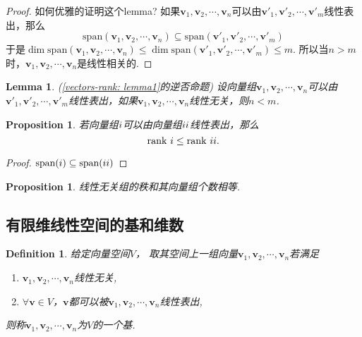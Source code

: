 \documentclass{article}
\newtheorem{lemma}[theorem]{Lemma}
\newtheorem{proposition}[theorem]{Proposition}
\newtheorem{definition}[theorem]{Definition}
\newcommand{\mbf}[1]{\bm{#1}}
\begin{document}
\begin{proof}
如何优雅的证明这个lemma? 如果$\mbf{v}_1,\mbf{v}_2,\cdots,\mbf{v}_n$可以由$\mbf{v}'_1,\mbf{v}'_2,\cdots,\mbf{v}'_m$线性表出，那么
$$
\text{span}(\mbf{v}_1,\mbf{v}_2,\cdots,\mbf{v}_n) \subseteq \text{span}(\mbf{v}'_1,\mbf{v}'_2,\cdots,\mbf{v}'_m)
$$
于是$\dim \text{span}(\mbf{v}_1,\mbf{v}_2,\cdots,\mbf{v}_n) \leq \dim \text{span}(\mbf{v}'_1,\mbf{v}'_2,\cdots,\mbf{v}'_m) \leq m$. 所以当$n > m$时，$\mbf{v}_1,\mbf{v}_2,\cdots,\mbf{v}_n$是线性相关的.
\end{proof}

\begin{lemma}
\rm (\ref{vectors-rank: lemma1}的逆否命题) 设向量组$\mbf{v}_1,\mbf{v}_2,\cdots,\mbf{v}_n$可以由$\mbf{v}'_1,\mbf{v}'_2,\cdots,\mbf{v}'_m$线性表出，如果$\mbf{v}_1,\mbf{v}_2,\cdots,\mbf{v}_n$线性无关，则$n < m$.
\end{lemma}

\begin{proposition}
\rm 若向量组$\uppercase\expandafter{\romannumeral1}$可以由向量组$\uppercase\expandafter{\romannumeral2}$线性表出，那么
$$
\text{rank}~\uppercase\expandafter{\romannumeral1} \leq \text{rank}~\uppercase\expandafter{\romannumeral2}. 
$$
\end{proposition}

\begin{proof}
$\text{span}(\uppercase\expandafter{\romannumeral1}) \subseteq \text{span}(\uppercase\expandafter{\romannumeral2})$
\end{proof}

\begin{proposition}
\rm 线性无关组的秩和其向量组个数相等.
\end{proposition}


\subsection{有限维线性空间的基和维数}

\begin{definition}
\rm 给定向量空间$V$， 取其空间上一组向量$\mbf{v}_1,\mbf{v}_2,\cdots,\mbf{v}_n$若满足
\begin{enumerate}
	\item $\mbf{v}_1,\mbf{v}_2,\cdots,\mbf{v}_n$线性无关,
	\item $\forall \mbf{v} \in V$，$\mbf{v}$都可以被$\mbf{v}_1,\mbf{v}_2,\cdots,\mbf{v}_n$线性表出,
\end{enumerate}
则称$\mbf{v}_1,\mbf{v}_2,\cdots,\mbf{v}_n$为$V$的一个基.
\end{definition}
\end{document}
